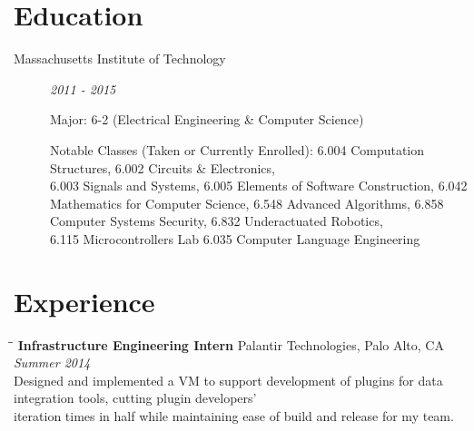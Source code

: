 \documentclass{res}
\begin{document}

	\address{
		Room 631D \\
		229 Vassar Street \\
		Cambridge, MA  02139
	}

	\address{
		\bf woursler.com \\
		woursler@mit.edu \\
		(541)-601-8295
	}

	\begin{resume}

		\vspace{-10pt}
		\section{Education}
			\begin{description}

				\item[Massachusetts Institute of Technology] \textit{2011 - 2015}

				Major: 6-2 (Electrical Engineering \& Computer Science)

				Notable Classes (Taken or Currently Enrolled):
				6.004 Computation Structures,
				6.002 Circuits \& Electronics,
				\\6.003 Signals and Systems,
				6.005 Elements of Software Construction,
				6.042 Mathematics for Computer Science,
				6.548 Advanced Algorithms,
				6.858 Computer Systems Security,
				6.832 Underactuated Robotics,
				\\6.115 Microcontrollers Lab
				6.035 Computer Language Engineering

			\end{description}

		\vspace{-20pt}
		\section{Experience}
			\vspace{-0.1in}

			\begin{tabbing}
				\hspace{2.3in}\= \hspace{2.6in}\= \kill %
				{\bf Infrastructure Engineering Intern} \>Palantir Technologies, Palo Alto, CA \> \textit{Summer 2014}
				\\Designed and implemented a VM to support development of plugins for data integration tools, cutting plugin developers'
				\\iteration times in half while maintaining ease of build and release for my team.
			\end{tabbing}\vspace{-20pt}


\end{resume}
\end{document}
